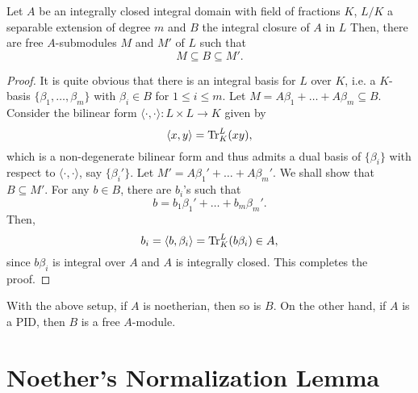 \begin{theorem}
    Let $A$ be an integrally closed integral domain with field of fractions $K$, $L/K$ a separable extension of degree $m$ and $B$ the integral closure of $A$ in $L$ Then, there are free $A$-submodules $M$ and $M'$ of $L$ such that 
    \begin{equation*}
        M\subseteq B\subseteq M'.
    \end{equation*}
\end{theorem}
\begin{proof}
    It is quite obvious that there is an integral basis for $L$ over $K$, i.e. a $K$-basis $\{\beta_1,\dots,\beta_m\}$ with $\beta_i\in B$ for $1\le i\le m$. Let $M = A\beta_1 + \dots + A\beta_m\subseteq B$. Consider the bilinear form $\langle\cdot,\cdot\rangle: L\times L\to K$ given by 
    \begin{equation*}
        \langle x,y\rangle = \operatorname{Tr}^L_K(xy),
    \end{equation*}
    which is a non-degenerate bilinear form and thus admits a dual basis of $\{\beta_i\}$ with respect to $\langle\cdot,\cdot\rangle$, say $\{\beta_i'\}$. Let $M' = A\beta_1' + \dots + A\beta_m'$. We shall show that $B\subseteq M'$. For any $b\in B$, there are $b_i$'s such that 
    \begin{equation}
        b = b_1\beta_1' + \dots + b_m\beta_m'.
    \end{equation}
    Then, 
    \begin{equation*}
        b_i = \langle b, \beta_i\rangle = \operatorname{Tr}^L_K(b\beta_i)\in A,
    \end{equation*}
    since $b\beta_i$ is integral over $A$ and $A$ is integrally closed. This completes the proof.
\end{proof}

\begin{corollary}
    With the above setup, if $A$ is noetherian, then so is $B$. On the other hand, if $A$ is a PID, then $B$ is a free $A$-module.
\end{corollary}

\section{Noether's Normalization Lemma}


